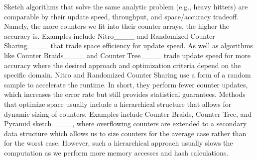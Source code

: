Sketch algorithms that solve the same analytic problem (e.g., heavy hitters) are comparable by their update speed, throughput, and space/accuracy tradeoff. Namely, the more counters we fit into their counter arrays, the higher the accuracy is. Examples include Nitro____ and Randomized Counter Sharing____ that trade space efficiency for update speed. As well as algorithms like
Counter Braids____ and Counter Tree____ trade update speed for more accuracy where the desired approach and optimization criteria depend on the specific domain. Nitro and Randomized Counter Sharing use a form of a random sample to accelerate the runtime. In short, they perform fewer counter updates, which increases the error rate but still provides statistical guarantees. Methods that optimize space usually include a hierarchical structure that allows for dynamic sizing of counters. Examples include Counter Braids, Counter Tree, and Pyramid sketch____, where overflowing counters are extended to a secondary data structure which allows us to size counters for the average case rather than for the worst case. However, such a hierarchical approach usually slows the computation as we perform more memory accesses and hash calculations.  
